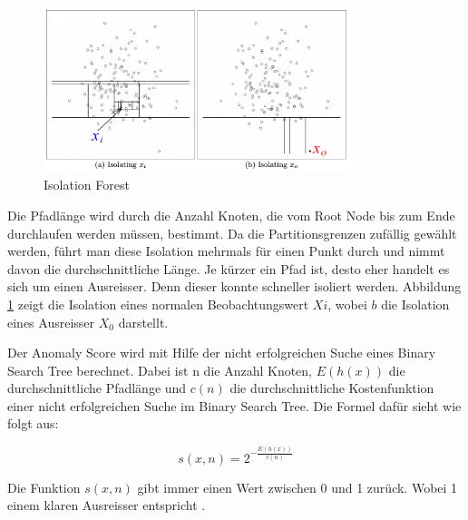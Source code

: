 \begin{figure}[h]
  \centering
  \includegraphics[width=0.8\textwidth]{images/isolation_forest.png}
  \caption[Isolation Forest]{Isolation Forest}%
  \label{fig:hintergrund_isolation_forest}
\end{figure}

Die Pfadlänge wird durch die Anzahl Knoten, die vom Root Node bis zum Ende durchlaufen werden müssen, bestimmt. Da die Partitionsgrenzen zufällig gewählt werden, führt man diese Isolation mehrmals für einen Punkt durch und nimmt davon die durchschnittliche Länge. Je kürzer ein Pfad ist, desto eher handelt es sich um einen Ausreisser. Denn dieser konnte schneller isoliert werden. Abbildung \ref{fig:hintergrund_isolation_forest} zeigt die Isolation  eines normalen Beobachtungswert $Xi$, wobei $b$ die Isolation eines Ausreisser $X_0$ darstellt.

Der Anomaly Score wird mit Hilfe der nicht erfolgreichen Suche eines Binary Search Tree berechnet. Dabei ist n die Anzahl Knoten, $E(h(x))$ die durchschnittliche Pfadlänge und $c(n)$ die durchschnittliche Kostenfunktion einer nicht erfolgreichen Suche im Binary Search Tree. Die Formel dafür sieht wie folgt aus:

\begin{equation}\label{eq:isolation}
s(x, n) = 2^{-\frac{E(h(x))}{c(n)}}
\end{equation}

Die Funktion $s(x, n)$ gibt immer einen Wert zwischen 0 und 1 zurück. Wobei 1 einem klaren Ausreisser entspricht \cite{isolation_forest_2}.